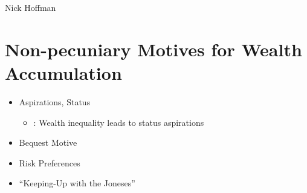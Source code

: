 \documentclass[11pt]{article}
\begin{document}
\begin{flushleft}
	Nick Hoffman
\end{flushleft}

\section*{Non-pecuniary Motives for Wealth Accumulation} 

\begin{itemize}
	\item Aspirations, Status
		\begin{itemize}
			\item \cite{stark2006}: Wealth inequality leads to status aspirations
		\end{itemize}
	\item Bequest Motive 
	\item Risk Preferences
	\item ``Keeping-Up with the Joneses''
\end{itemize}



\end{document}
